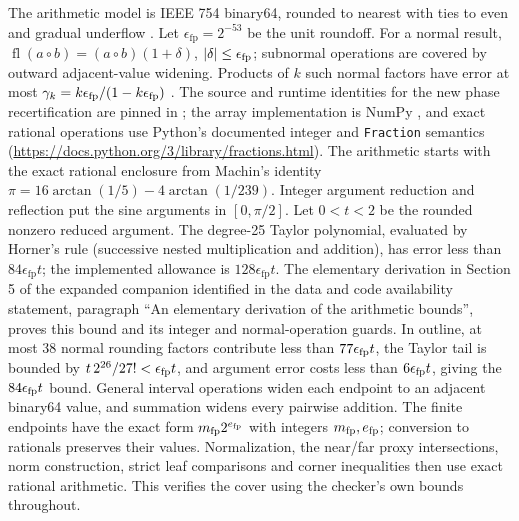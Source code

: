 The arithmetic model is IEEE 754 binary64, rounded to nearest with ties
to even and gradual underflow \cite{IEEE7542019}. Let
$\epsilon_{\mathrm{fp}}=2^{-53}$ be the unit roundoff. For a normal result,
$\operatorname{fl}(a\mathbin\circ b)=(a\mathbin\circ b)(1+\delta)$,
$|\delta|\leq\epsilon_{\rm fp}$; subnormal operations are covered by
outward adjacent-value widening. Products of $k$ such normal factors
have error at most $\gamma_k=k\epsilon_{\rm fp}/(1-k\epsilon_{\rm fp})$
\cite[Chapters~3--5]{Higham2002}. The source and runtime identities for the new phase recertification are
pinned in ;
the array implementation is NumPy \cite{NumPy2020},
and exact rational operations use Python's documented integer and
\texttt{Fraction} semantics
(\url{https://docs.python.org/3/library/fractions.html}).
The arithmetic starts with the exact rational enclosure from Machin's
identity $\pi=16\arctan(1/5)-4\arctan(1/239)$.
Integer argument reduction and reflection put the sine arguments in
$[0,\pi/2]$. Let $0<t<2$ be the rounded nonzero reduced argument.
The degree-25 Taylor polynomial, evaluated by Horner's rule (successive
nested multiplication and addition), has error less than
$84\epsilon_{\mathrm{fp}}t$; the implemented allowance is
$128\epsilon_{\mathrm{fp}}t$. The elementary derivation in Section 5 of
the expanded companion identified in the data and code availability statement,
paragraph ``An elementary derivation of the arithmetic bounds'', proves
this bound and its integer and normal-operation guards.
In outline, at most 38 normal rounding factors contribute less than
$77\epsilon_{\rm fp}t$, the Taylor tail is bounded by
$t\,2^{26}/27!<\epsilon_{\rm fp}t$,
and argument error costs less than $6\epsilon_{\rm fp}t$, giving the
$84\epsilon_{\rm fp}t$ bound.
General interval operations widen
each endpoint to an adjacent binary64 value, and summation widens every
pairwise addition. The finite endpoints have the exact form $m_{\rm fp}2^{e_{\rm fp}}$ with
integers $m_{\rm fp},e_{\rm fp}$; conversion to rationals preserves their values.
Normalization, the near/far proxy intersections, norm construction,
strict leaf comparisons and corner inequalities then use exact rational
arithmetic. This verifies the cover using the checker's own bounds
throughout.

